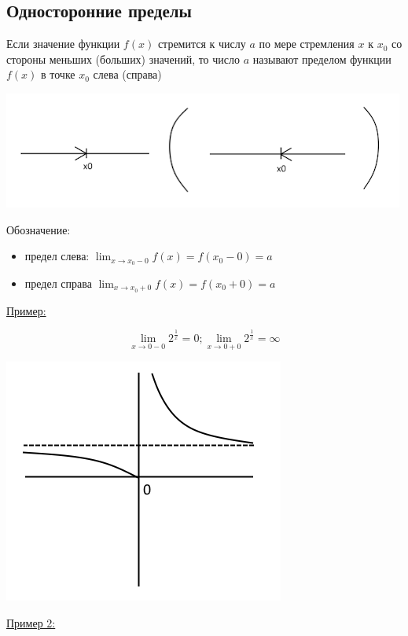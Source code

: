 \documentclass[12pt]{article}
\begin{document}
    \subsection{Односторонние пределы}
    Если значение функции $f(x)$ стремится к числу $a$ по мере стремления $x$ к $x_0$ со стороны меньших (больших) значений, то число $a$ называют пределом функции $f(x)$ в точке $x_0$ слева (справа)
    \begin{center}
        \includegraphics{3.2.1}
    \end{center}
    Обозначение:
    \begin{itemize}
        \item предел слева: $\lim_{x\to x_0 - 0}f(x) = f(x_0 - 0) = a$
        \item предел справа $\lim_{x\to x_0 + 0}f(x) = f(x_0 + 0) = a$
    \end{itemize}
    \underline{Пример:}
    \begin{adjustwidth}{1.5em}{1.5em}
        \[
            \lim_{x\to 0-0} 2^{\frac{1}{x}} = 0; \lim_{x\to 0+0} 2^{\frac{1}{x}} = \infty
        \]
        \begin{center}
            \includegraphics{3.2.2}
        \end{center}
    \end{adjustwidth}
    \underline{Пример 2:}
\end{document}
